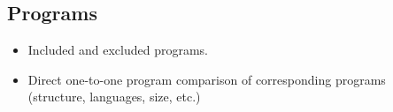 \subsection{Programs}\label{Programs}

\begin{itemize}
    \item Included and excluded programs.
    \item Direct one-to-one program comparison of corresponding programs \\(structure, languages, size, etc.)
\end{itemize}
